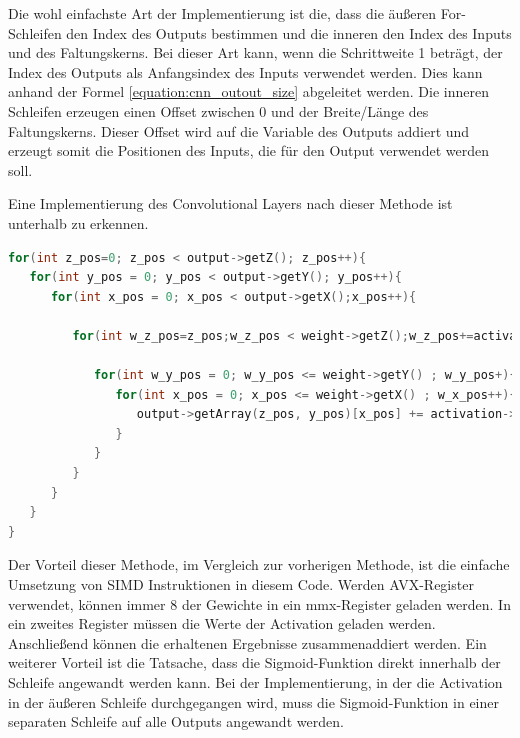 \documentclass[../main.tex]{subfiles}
\begin{document}
Die wohl einfachste Art der Implementierung ist die, dass die äußeren For-Schleifen den Index des Outputs bestimmen und die inneren den Index des Inputs und des Faltungskerns. Bei dieser Art kann, wenn die Schrittweite 1 beträgt, der Index des Outputs als Anfangsindex des Inputs verwendet werden. Dies kann anhand der Formel \ref{equation:cnn_outout_size} abgeleitet werden. Die inneren Schleifen erzeugen einen Offset zwischen 0 und der Breite/Länge des Faltungskerns. Dieser Offset wird auf die Variable des Outputs addiert und erzeugt somit die Positionen des Inputs, die für den Output verwendet werden soll.

Eine Implementierung des Convolutional Layers nach dieser Methode ist unterhalb zu erkennen.
\begin{lstlisting}[language=c++, caption=Convolution: Output durchgehen, captionpos=b, label=listing:conv_output, frame=single, linewidth=\textwidth, breaklines=true]
for(int z_pos=0; z_pos < output->getZ(); z_pos++){
   for(int y_pos = 0; y_pos < output->getY(); y_pos++){
      for(int x_pos = 0; x_pos < output->getX();x_pos++){
      
         for(int w_z_pos=z_pos;w_z_pos < weight->getZ();w_z_pos+=activation->getZ()){
         
            for(int w_y_pos = 0; w_y_pos <= weight->getY() ; w_y_pos+){
               for(int x_pos = 0; x_pos <= weight->getX() ; w_x_pos++){
                  output->getArray(z_pos, y_pos)[x_pos] += activation->getArray(z_pos,y_pos+w_y_pos)[x_pos+w_x_pos] * weight->getArray(w_z_pos,w_y_rec)[w_x_rec];
               }
            }
         }
      }
   }
}
\end{lstlisting}

Der Vorteil dieser Methode, im Vergleich zur vorherigen Methode, ist die einfache Umsetzung von SIMD Instruktionen in diesem Code. Werden AVX-Register verwendet, können immer 8 der Gewichte in ein mmx-Register geladen werden. In ein zweites Register müssen die Werte der Activation geladen werden. Anschließend können die erhaltenen Ergebnisse zusammenaddiert werden.
Ein weiterer Vorteil ist die Tatsache, dass die Sigmoid-Funktion direkt innerhalb der Schleife angewandt werden kann. Bei der Implementierung, in der die Activation in der äußeren Schleife durchgegangen wird, muss die Sigmoid-Funktion in einer separaten Schleife auf alle Outputs angewandt werden.
\end{document}
